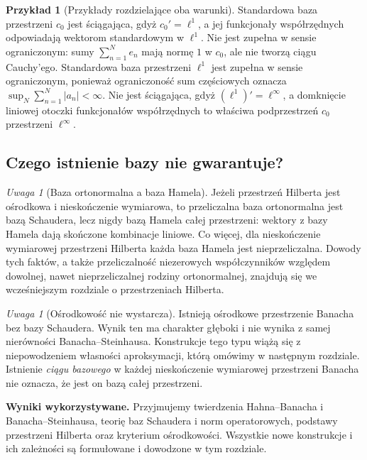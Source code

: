 \documentclass[11pt,a4paper]{article}
\numberwithin{equation}{section}
\theoremstyle{plain}
\theoremstyle{definition}
\newtheorem{przyklad}[twierdzenie]{Przykład}
\theoremstyle{remark}
\newtheorem{uwaga}[twierdzenie]{Uwaga}
\begin{document}
\begin{przyklad}[Przykłady rozdzielające oba warunki]
\label{ex:james-examples27}
Standardowa baza przestrzeni $c_0$ jest ściągająca,
gdyż $c_0'=\ell^1$, a jej funkcjonały współrzędnych
odpowiadają wektorom standardowym w $\ell^1$.
Nie jest zupełna w sensie ograniczonym: sumy
$\sum_{n=1}^Ne_n$ mają normę $1$ w $c_0$, ale
nie tworzą ciągu Cauchy'ego.
Standardowa baza przestrzeni $\ell^1$ jest zupełna w sensie
ograniczonym, ponieważ ograniczoność sum częściowych oznacza
$\sup_N\sum_{n=1}^N|a_n|<\infty$.
Nie jest ściągająca, gdyż $(\ell^1)'=\ell^\infty$,
a domknięcie liniowej otoczki funkcjonałów współrzędnych
to właściwa podprzestrzeń $c_0$ przestrzeni $\ell^\infty$.
\end{przyklad}

\subsection{Czego istnienie bazy nie gwarantuje?}

\begin{uwaga}[Baza ortonormalna a baza Hamela]
\label{rem:hamel-vs-schauder27}
Jeżeli przestrzeń Hilberta jest ośrodkowa i nieskończenie
wymiarowa, to przeliczalna baza ortonormalna jest bazą
Schaudera, lecz nigdy bazą Hamela całej przestrzeni:
wektory z bazy Hamela dają skończone kombinacje liniowe.
Co więcej, dla nieskończenie wymiarowej przestrzeni Hilberta
każda baza Hamela jest nieprzeliczalna. Dowody tych faktów,
a także przeliczalność niezerowych współczynników
względem dowolnej, nawet nieprzeliczalnej rodziny
ortonormalnej, znajdują się we wcześniejszym rozdziale o przestrzeniach Hilberta.
\end{uwaga}

\begin{uwaga}[Ośrodkowość nie wystarcza]
\label{rem:enflo27}
Istnieją ośrodkowe przestrzenie Banacha bez bazy Schaudera.
Wynik ten ma charakter głęboki i nie wynika z samej
nierówności Banacha--Steinhausa. Konstrukcje tego typu
wiążą się z niepowodzeniem własności aproksymacji,
którą omówimy w następnym rozdziale. Istnienie
\emph{ciągu bazowego} w każdej nieskończenie wymiarowej
przestrzeni Banacha nie oznacza, że jest on bazą całej
przestrzeni.
\end{uwaga}


\setcounter{section}{27}
\noindent\textbf{Wyniki wykorzystywane.}
Przyjmujemy twierdzenia Hahna--Banacha i Banacha--Steinhausa,
teorię baz Schaudera i norm operatorowych, podstawy przestrzeni
Hilberta oraz kryterium ośrodkowości. Wszystkie nowe konstrukcje
i ich zależności są formułowane i dowodzone w tym rozdziale.
\par\medskip
\end{document}
